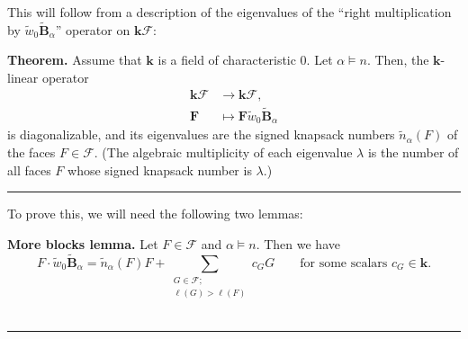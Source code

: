 \documentclass[12pt]{article}
\theoremstyle{definition}%
\newtheorem{thm}{Theorem}[section]
\newtheorem{lem}[thm]{Lemma}
\theoremstyle{definition}%
\theoremstyle{remark}%
\newcommand{\tup}[1]{\left( #1 \right)}
\newcommand{\kk}{\mathbf{k}}
\newcommand{\kf}{\kk\mathcal{F}}
\newcommand{\BBta}{\widetilde{\mathbf{B}}_{\alpha}}
\newcommand{\FF}{\mathbf{F}}
\newcommand{\CF}{\mathcal{F}}
\newcommand{\wotil}{\widetilde{w}_0}
\newcommand{\nna}{\widetilde{n}_{ \alpha } }%
\newenvironment{thm}[1][Theorem]{\noindent\textbf{#1.} }{\ \rule{0.5em}{0.5em}}
\newenvironment{lem}[1][Lemma]{\noindent\textbf{#1.} }{\ \rule{0.5em}{0.5em}}
\begin{document}
This will follow from a description of the eigenvalues of the ``right multiplication by $\wotil\BBta$'' operator on $\kf$:


\begin{thm}
\label{thm.spec.w0Baright}
Assume that $\kk$ is a field of characteristic $0$.
Let $\alpha \models n$.
Then, the $\kk$-linear operator
\begin{align*}
\kf  & \to \kf,\\
\FF  & \mapsto \FF\wotil\BBta
\end{align*}
is diagonalizable, and its eigenvalues are the signed knapsack numbers
$\nna\tup{F} $ of the faces $F\in \CF$.
(The algebraic multiplicity of each eigenvalue $\lambda$ is the number
of all faces $F$ whose signed knapsack number is $\lambda$.)
\end{thm}



To prove this, we will need the following two lemmas:

\begin{lem}[More blocks lemma]
    \label{mblks_lem}
    Let $F \in \CF$ and $\alpha \models n$. Then we have
    \[
    F\cdot \wotil\BBta = \nna \tup{F}F + \sum_{\substack{G \in \CF;\\ \ell \tup{G} > \ell \tup{F}}} c_{G}G
	\qquad \text{for some scalars $c_G \in \kk$.}
    \]
\end{lem}
\end{document}

